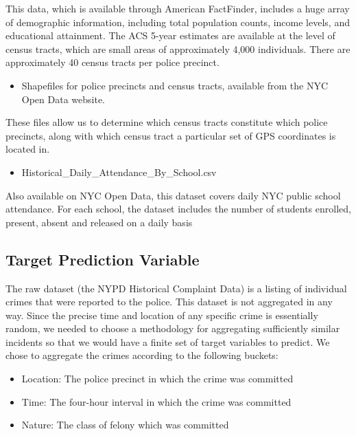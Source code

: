 \documentclass[10pt,journal,compsoc]{IEEEtran}
\begin{document}
This data, which is available through American FactFinder, includes a huge array of demographic information, including total population counts, income levels, and educational attainment. The ACS 5-year estimates are available at the level of census tracts, which are small areas of approximately 4,000 individuals. There are approximately 40 census tracts per police precinct.\\

\begin{itemize}
 \item Shapefiles for police precincts and census tracts, available from the NYC Open Data website.
\end{itemize}
These files allow us to determine which census tracts constitute which police precincts,
along with which census tract a particular set of GPS coordinates is located in.\\

\begin{itemize}
 \item Historical\_Daily\_Attendance\_By\_School.csv
\end{itemize}
Also available on NYC Open Data, this dataset
covers daily NYC public school attendance. For each school, the dataset includes the number of students enrolled, present, absent and released on a daily basis\\

\subsection{Target Prediction Variable}
The raw dataset (the NYPD Historical Complaint Data) is a listing of individual crimes
that were reported to the police. This dataset is not aggregated in any way. Since the
precise time and location of any specific crime is essentially random, we needed to
choose a methodology for aggregating sufficiently similar incidents so that we would
have a finite set of target variables to predict. We chose to aggregate the crimes
according to the following buckets:
\begin{itemize}
 \item Location: The police precinct in which the crime was committed
 \item Time: The four-hour interval in which the crime was committed
 \item Nature: The class of felony which was committed
\end{itemize}
\end{document}
